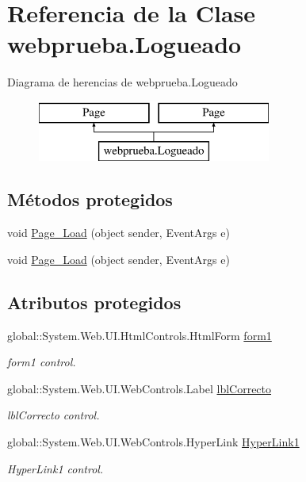 \hypertarget{classwebprueba_1_1_logueado}{}\section{Referencia de la Clase webprueba.\+Logueado}
\label{classwebprueba_1_1_logueado}
Diagrama de herencias de webprueba.\+Logueado\begin{figure}[H]
\begin{center}
\leavevmode
\includegraphics[height=2.000000cm]{classwebprueba_1_1_logueado}
\end{center}
\end{figure}
\subsection*{Métodos protegidos}
\begin{DoxyCompactItemize}
\item 
void \mbox{\hyperlink{classwebprueba_1_1_logueado_a940dfad7fc27bdd09f1bd299a494e886}{Page\+\_\+\+Load}} (object sender, Event\+Args e)
\item 
void \mbox{\hyperlink{classwebprueba_1_1_logueado_a940dfad7fc27bdd09f1bd299a494e886}{Page\+\_\+\+Load}} (object sender, Event\+Args e)
\end{DoxyCompactItemize}
\subsection*{Atributos protegidos}
\begin{DoxyCompactItemize}
\item 
global\+::\+System.\+Web.\+U\+I.\+Html\+Controls.\+Html\+Form \mbox{\hyperlink{classwebprueba_1_1_logueado_a414ae0b7a8768f2b85096594268ceeda}{form1}}
\begin{DoxyCompactList}\small\item\em form1 control. \end{DoxyCompactList}\item 
global\+::\+System.\+Web.\+U\+I.\+Web\+Controls.\+Label \mbox{\hyperlink{classwebprueba_1_1_logueado_a6c53109d079503d4d447eb6efae76c5a}{lbl\+Correcto}}
\begin{DoxyCompactList}\small\item\em lbl\+Correcto control. \end{DoxyCompactList}\item 
global\+::\+System.\+Web.\+U\+I.\+Web\+Controls.\+Hyper\+Link \mbox{\hyperlink{classwebprueba_1_1_logueado_af725d5cb73a7f996b023ede8aa18a283}{Hyper\+Link1}}
\begin{DoxyCompactList}\small\item\em Hyper\+Link1 control. \end{DoxyCompactList}\end{DoxyCompactItemize}



